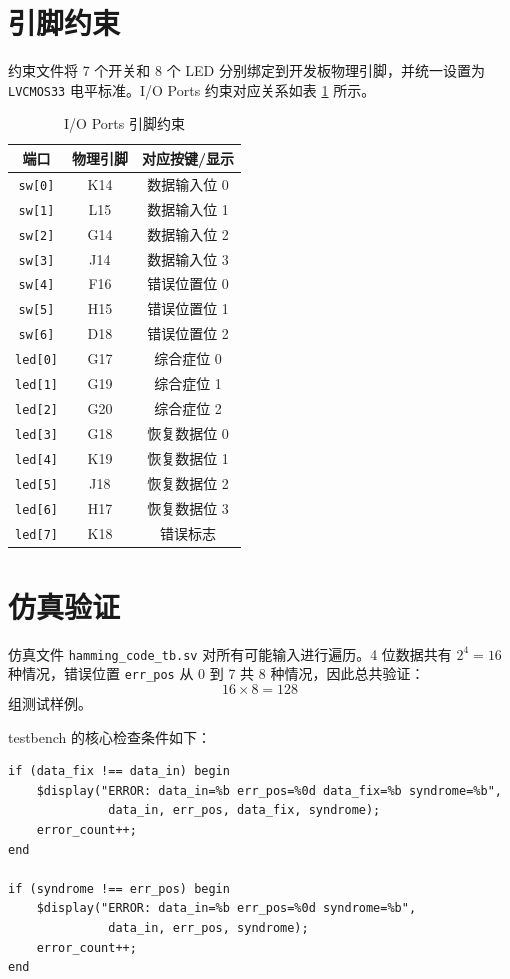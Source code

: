 ﻿\documentclass[UTF8,a4paper,12pt]{ctexart}
\begin{document}
\section{引脚约束}

约束文件将 7 个开关和 8 个 LED 分别绑定到开发板物理引脚，并统一设置为 \verb|LVCMOS33| 电平标准。I/O Ports 约束对应关系如表 \ref{tab:io-ports} 所示。

\begin{table}[H]
  \centering
  \caption{I/O Ports 引脚约束}
  \label{tab:io-ports}
  \begin{tabular}{ccc}
    \toprule
    端口 & 物理引脚 & 对应按键/显示 \\
    \midrule
    \verb|sw[0]| & K14 & 数据输入位 0 \\
    \verb|sw[1]| & L15 & 数据输入位 1 \\
    \verb|sw[2]| & G14 & 数据输入位 2 \\
    \verb|sw[3]| & J14 & 数据输入位 3 \\
    \verb|sw[4]| & F16 & 错误位置位 0 \\
    \verb|sw[5]| & H15 & 错误位置位 1 \\
    \verb|sw[6]| & D18 & 错误位置位 2 \\
    \verb|led[0]| & G17 & 综合症位 0 \\
    \verb|led[1]| & G19 & 综合症位 1 \\
    \verb|led[2]| & G20 & 综合症位 2 \\
    \verb|led[3]| & G18 & 恢复数据位 0 \\
    \verb|led[4]| & K19 & 恢复数据位 1 \\
    \verb|led[5]| & J18 & 恢复数据位 2 \\
    \verb|led[6]| & H17 & 恢复数据位 3 \\
    \verb|led[7]| & K18 & 错误标志 \\
    \bottomrule
  \end{tabular}
\end{table}

\section{仿真验证}

仿真文件 \verb|hamming_code_tb.sv| 对所有可能输入进行遍历。4 位数据共有 $2^4=16$ 种情况，错误位置 \verb|err_pos| 从 0 到 7 共 8 种情况，因此总共验证：
\[
16 \times 8 = 128
\]
组测试样例。

testbench 的核心检查条件如下：
\begin{lstlisting}[style=svstyle,caption={testbench 自动检查条件}]
if (data_fix !== data_in) begin
    $display("ERROR: data_in=%b err_pos=%0d data_fix=%b syndrome=%b",
              data_in, err_pos, data_fix, syndrome);
    error_count++;
end

if (syndrome !== err_pos) begin
    $display("ERROR: data_in=%b err_pos=%0d syndrome=%b",
              data_in, err_pos, syndrome);
    error_count++;
end
\end{lstlisting}
\end{document}
